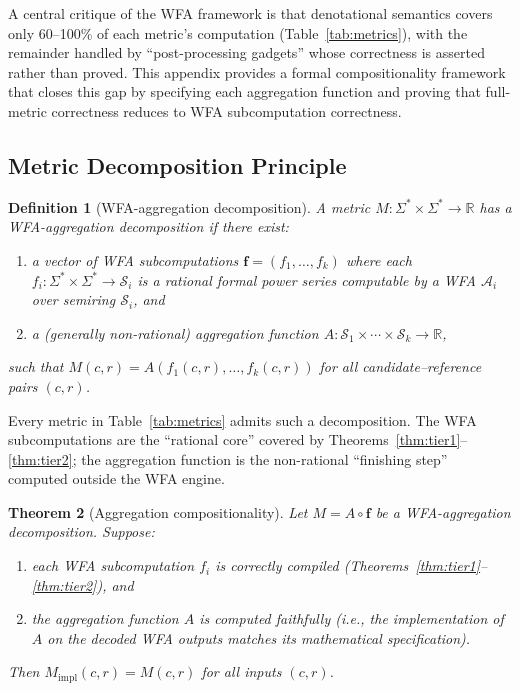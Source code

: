 \documentclass[11pt]{article}
\newtheorem{theorem}{Theorem}[section]
\newtheorem{definition}[theorem]{Definition}
\newcommand{\R}{\mathbb{R}}
\newcommand{\semiring}[1]{\mathcal{#1}}
\newcommand{\wfa}{\mathcal{A}}
\begin{document}
A central critique of the WFA framework is that denotational semantics
covers only 60--100\% of each metric's computation (Table~\ref{tab:metrics}),
with the remainder handled by ``post-processing gadgets''
whose correctness is asserted rather than proved.  This appendix
provides a formal compositionality framework that closes this gap
by specifying each aggregation function and proving that full-metric
correctness reduces to WFA subcomputation correctness.

\subsection{Metric Decomposition Principle}

\begin{definition}[WFA-aggregation decomposition]\label{def:decomposition}
A metric $M : \Sigma^* \times \Sigma^* \to \R$ has a
\emph{WFA-aggregation decomposition} if there exist:
\begin{enumerate}[nosep]
\item a vector of WFA subcomputations
  $\mathbf{f} = (f_1, \ldots, f_k)$ where each
  $f_i : \Sigma^* \times \Sigma^* \to \semiring{S}_i$ is a rational
  formal power series computable by a WFA $\wfa_i$ over semiring
  $\semiring{S}_i$, and
\item a (generally non-rational) aggregation function
  $A : \semiring{S}_1 \times \cdots \times \semiring{S}_k \to \R$,
\end{enumerate}
such that $M(c, r) = A(f_1(c,r), \ldots, f_k(c,r))$ for all
candidate--reference pairs $(c,r)$.
\end{definition}

\noindent Every metric in Table~\ref{tab:metrics} admits such a
decomposition.  The WFA subcomputations are the ``rational core''
covered by Theorems~\ref{thm:tier1}--\ref{thm:tier2}; the aggregation
function is the non-rational ``finishing step'' computed outside the
WFA engine.

\begin{theorem}[Aggregation compositionality]\label{thm:composition}
Let $M = A \circ \mathbf{f}$ be a WFA-aggregation decomposition.
Suppose:
\begin{enumerate}[nosep]
\item each WFA subcomputation $f_i$ is correctly compiled
  (Theorems~\ref{thm:tier1}--\ref{thm:tier2}), and
\item the aggregation function $A$ is computed faithfully
  (i.e., the implementation of $A$ on the decoded WFA outputs
  matches its mathematical specification).
\end{enumerate}
Then $M_{\mathrm{impl}}(c,r) = M(c,r)$ for all inputs $(c,r)$.
\end{theorem}
\end{document}
